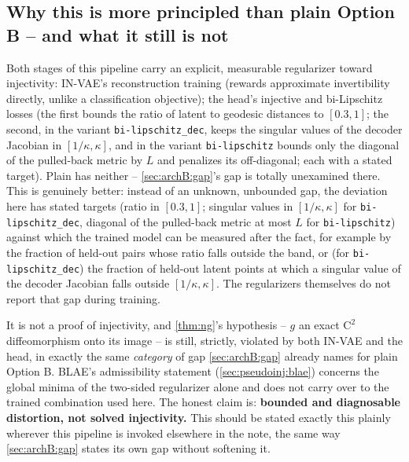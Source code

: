 \subsection{Why this is more principled than plain Option B -- and what it still is not}
\label{sec:pseudoinj:principled}
Both stages of this pipeline carry an explicit, measurable regularizer toward injectivity: IN-VAE's
reconstruction training (rewards approximate invertibility directly, unlike a classification objective);
the head's injective and bi-Lipschitz losses (the first bounds the ratio of latent to geodesic
distances to $[0.3,1]$; the second, in the variant \texttt{bi-lipschitz\_dec}, keeps the
singular values of the decoder Jacobian in $[1/\kappa,\kappa]$, and in the variant
\texttt{bi-lipschitz} bounds only the diagonal of the pulled-back metric by $L$ and
penalizes its off-diagonal; each with a stated target).
Plain  has neither -- \cref{sec:archB:gap}'s gap is totally unexamined there.
This is genuinely better: instead of an unknown, unbounded gap, the deviation here has stated targets
(ratio in $[0.3,1]$; singular values in $[1/\kappa,\kappa]$ for \texttt{bi-lipschitz\_dec},
diagonal of the pulled-back metric at most $L$ for \texttt{bi-lipschitz}) against which the
trained model can be measured after the fact, for example by the fraction of held-out pairs
whose ratio falls outside the band, or (for \texttt{bi-lipschitz\_dec}) the fraction of
held-out latent points at which a singular value of the decoder Jacobian falls outside
$[1/\kappa,\kappa]$. The regularizers themselves do not report that gap during training.

It is not a proof of injectivity, and \cref{thm:ng}'s hypothesis -- $g$ an exact $\mathrm{C}^2$ 
diffeomorphism onto
its image -- is still, strictly, violated by both IN-VAE and the head, in exactly the same
\emph{category} of gap \cref{sec:archB:gap} already names for plain Option B. BLAE's
admissibility statement (\cref{sec:pseudoinj:blae}) concerns the global minima of the
two-sided regularizer alone and does not carry over to the trained combination used here.
The honest claim is:
\textbf{bounded and diagnosable distortion, not solved injectivity.} This should be stated exactly this
plainly wherever this pipeline is invoked elsewhere in the note, the same way \cref{sec:archB:gap} states
its own gap without softening it.

